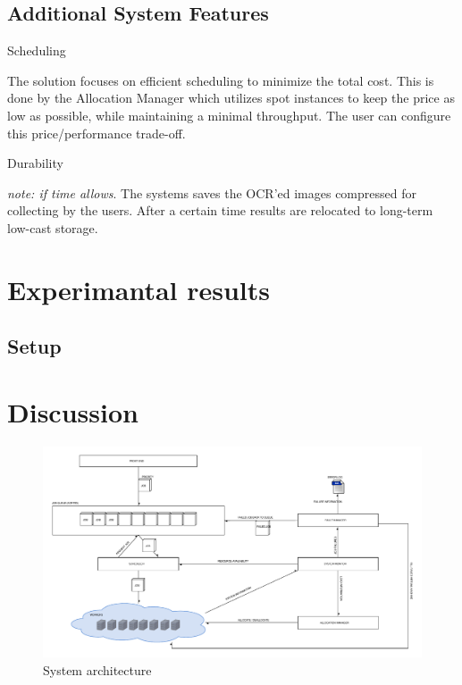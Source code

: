 \documentclass[a4paper]{IEEEtran}
\begin{document}
\subsection*{Additional System Features}

\begin{LaTeXdescription}

\item[Scheduling]

The solution focuses on efficient scheduling to minimize the total cost. This is done by the Allocation Manager which utilizes spot instances to keep the price as low as possible, while maintaining a minimal throughput. The user can configure this price/performance trade-off.

\item[Durability]

\emph{note: if time allows}. The systems saves the OCR'ed images compressed for collecting by the users. After a certain time results are relocated to long-term low-cast storage.

\end{LaTeXdescription}

\section{Experimantal results}

\subsection{Setup}

\section{Discussion}

\begin{thebibliography}{9}

\end{thebibliography}


\newpage

\begin{landscape}
\appendix

\begin{figure}[h]
\centering
\includegraphics[width=770pt]{"System Architecture 2"}
\caption{System architecture}
\label{fig_sysarch}
\end{figure}
\end{landscape}
\clearpage
\end{document}
